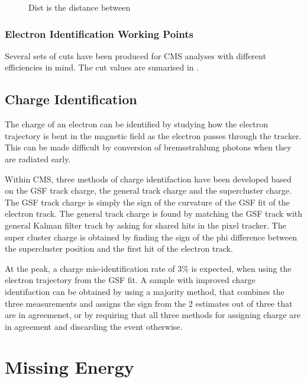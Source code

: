 \begin{figure}[htb]
  \centering
  \caption{Dist is the distance between}
  \label{fig:dist}
\end{figure}

\subsubsection{Electron Identification Working Points}

Several sets of cuts have been produced for CMS analyses with different
efficiencies in mind. The cut values are sumarised in .

\subsection{Charge Identification}
The charge of an electron can be identified by studying how the electron trajectory
is bent in the magnetic field as the electron passes through the tracker. This
can be made difficult by conversion of bremsstrahlung photons when they are
radiated early. 

Within CMS, three methods of charge identifaction have been developed based on
the GSF track charge, the general track charge and the supercluster charge. The
GSF track charge is simply the sign of the curvature of the GSF fit of the
electron track. The general track charge is found by matching the GSF track with
general Kalman filter track by asking for shared hits in the pixel tracker. 
The super cluster charge is obtained by finding the sign of the phi difference
between the supercluster position and the first hit of the electron track.

At the \PZ peak, a charge mis-identification rate of \unit{3}{\%} is expected,
when using the electron trajectory from the GSF fit.  A sample with improved
charge identifaction can be obtained by using a majority method, that combines
the three measurements and assigns the sign from the 2 estimates out of three
that are in agreemenet, or by requiring that all three methods for assigning
charge are in agreement and discarding the event otherwise.

\section{Missing Energy}

